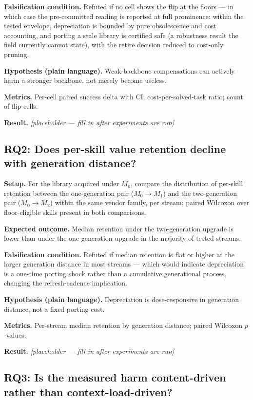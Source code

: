 \documentclass[11pt]{article}
\newcommand{\resultplaceholder}{\textit{[placeholder --- fill in after experiments are run]}}
\begin{document}
\textbf{Falsification condition.} Refuted if no cell shows the flip at the floors --- in which case the pre-committed reading is reported at full prominence: within the tested envelope, depreciation is bounded by pure obsolescence and cost accounting, and porting a stale library is certified safe (a robustness result the field currently cannot state), with the retire decision reduced to cost-only pruning.

\textbf{Hypothesis (plain language).} Weak-backbone compensations can actively harm a stronger backbone, not merely become useless.

\textbf{Metrics.} Per-cell paired success delta with CI; cost-per-solved-task ratio; count of flip cells.

\textbf{Result.} \resultplaceholder

\subsection{RQ2: Does per-skill value retention decline with generation distance?}

\textbf{Setup.} For the library acquired under $M_0$, compare the distribution of per-skill retention between the one-generation pair ($M_0 \rightarrow M_1$) and the two-generation pair ($M_0 \rightarrow M_2$) within the same vendor family, per stream; paired Wilcoxon over floor-eligible skills present in both comparisons.

\textbf{Expected outcome.} Median retention under the two-generation upgrade is lower than under the one-generation upgrade in the majority of tested streams.

\textbf{Falsification condition.} Refuted if median retention is flat or higher at the larger generation distance in most streams --- which would indicate depreciation is a one-time porting shock rather than a cumulative generational process, changing the refresh-cadence implication.

\textbf{Hypothesis (plain language).} Depreciation is dose-responsive in generation distance, not a fixed porting cost.

\textbf{Metrics.} Per-stream median retention by generation distance; paired Wilcoxon $p$-values.

\textbf{Result.} \resultplaceholder

\subsection{RQ3: Is the measured harm content-driven rather than context-load-driven?}
\end{document}
